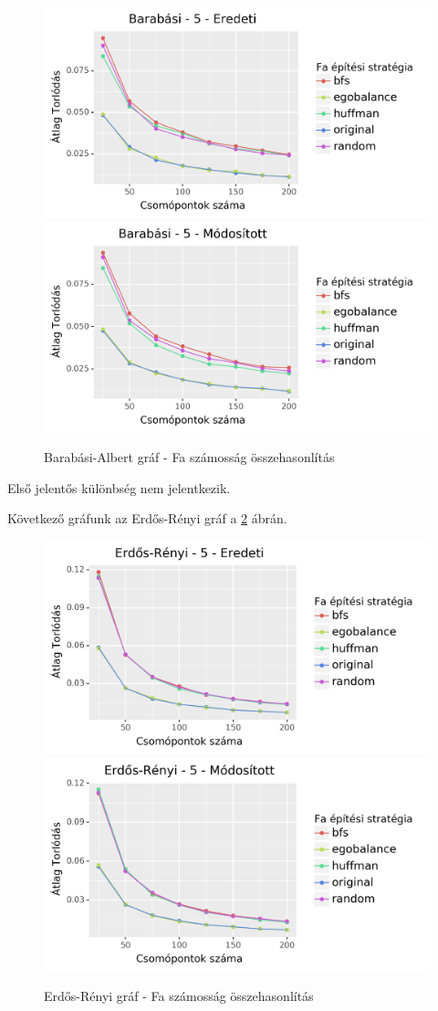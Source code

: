 \documentclass[12pt]{report}
\begin{document}
\begin{figure}[H]
	\begin{center}
		\includegraphics[width=0.49\linewidth]{pictures/barabasi_con_e.png}
		\includegraphics[width=0.49\linewidth]{pictures/barabasi_con_m.png}
		\caption{Barabási-Albert gráf - Fa számosság összehasonlítás}
		\label{barabasi-tree-difference-con}
	\end{center}
\end{figure}

Első jelentős különbség nem jelentkezik.

Következő gráfunk az Erdős-Rényi gráf a \ref{erdos-tree-difference-con} ábrán.

\begin{figure}[H]
	\begin{center}
		\includegraphics[width=0.49\linewidth]{pictures/erdos_con_e.png}
		\includegraphics[width=0.49\linewidth]{pictures/erdos_con_m.png}
		\caption{Erdős-Rényi gráf - Fa számosság összehasonlítás}
		\label{erdos-tree-difference-con}
	\end{center}
\end{figure}
\end{document}
